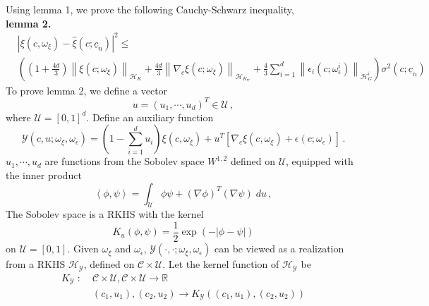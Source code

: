 Using lemma 1, we prove the following Cauchy-Schwarz inequality,\\
{\textbf{lemma 2.}}
\begin{equation*}\begin{split}
  &\left|\xi(c,\omega_\xi) - \hat{\xi}(c;\underline{c}_n) \right|^2
  \le \\ &\left(\left(1+\frac{4d}{3}\right)  \left\| \xi(c; \omega_\xi) \right\|_{\mathcal{H}_K}
      + \frac{4d}{3} \left\| \nabla_c \xi(c;\omega_\xi)
        \right\|_{\mathcal{H}_{K_\nabla}}
      +\frac{4}{3}\sum_{i=1}^d  
       \left\| \epsilon_i(c;\omega_\epsilon^i) \right\|_{\mathcal{H}_G^i} \right)
      \sigma^2(c; \underline{c}_n)
\end{split}\end{equation*}
To prove lemma 2, we define a vector 
\begin{equation*}
    u = \left(u_1, \cdots, u_d\right)^T \in \mathcal{U}\,,
\end{equation*}
where
$\mathcal{U} = [0,1]^d$.
Define an auxiliary function
\begin{equation*}
    \mathcal{Y}
    (c,u;\omega_\xi, \omega_\epsilon) = \left(1-\sum_{i=1}^d u_i\right) \xi(c, \omega_\xi) + u^T
    \left[\nabla_c\xi(c,\omega_\xi) + \epsilon(c;\omega_\epsilon) \right]\,.
\end{equation*}
$u_1, \cdots, u_d$ are functions from
the Sobolev space
$W^{1,2}$ defined on $\mathcal{U}$, equipped with the inner product
\begin{equation*}
    \left< \phi, \psi \right>  = \int_{\mathcal{U}} \phi\psi + (\nabla\phi)^T (\nabla \psi)  \; du\,,
\end{equation*}
The Sobolev space is a RKHS with the kernel
\begin{equation*}
    K_u(\phi, \psi) = \frac{1}{2} \exp\left(- \left|\phi-\psi \right|\right)
\end{equation*}
on $\mathcal{U} = [0,1]$. 
Given $\omega_\xi$ and $\omega_\epsilon$,
$\mathcal{Y}(\cdot,\cdot;\omega_\xi,\omega_\epsilon)$ can be viewed as a realization from a RKHS
$\mathcal{H}_{\mathcal{Y}}$, defined on $\mathcal{C}\times \mathcal{U}$. Let the kernel function of
$\mathcal{H}_{\mathcal{Y}}$ be
\begin{equation*}\begin{split}
    K_{\mathcal{Y}}\;:\;  &  \mathcal{C}\times \mathcal{U}, \mathcal{C}\times \mathcal{U} \rightarrow \mathbb{R}\\
              & (c_1, u_1), (c_2, u_2)\rightarrow K_{\mathcal{Y}}((c_1, u_1), (c_2, u_2))
\end{split}\end{equation*}
